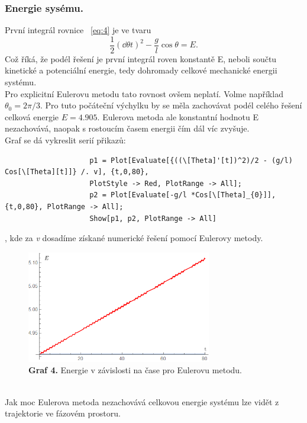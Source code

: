 \documentclass[reqno, a4paper]{amsart}
\begin{document}
				\subsubsection{Energie sysému.} První integrál rovnice ~\eqref{eq:4} je ve tvaru
				\begin{equation}
					\frac{1}{2}
					\left(
					\dd{\theta}{t}
					\right)^2
					-
					\frac{g}{l}
					\cos \theta
					=
					E
					.
				\end{equation}
				Což říká, že podél řešení je první integrál roven konstantě E, neboli součtu kinetické a potenciální energie, tedy dohromady celkové mechanické energii systému.
				\\
				Pro explicitní Eulerovu metodu tato rovnost ovšem neplatí. Volme například $\theta_{0} =2\pi/3$. Pro tuto počáteční výchylku by se měla zachovávat podél celého řešení celková energie $E=4.905$. Eulerova metoda ale konstantní hodnotu E nezachovává, naopak s rostoucím časem energii čím dál víc zvyšuje.
				\\
				Graf se dá vykreslit serií přikazů:
				\begin{verbatim}
					p1 = Plot[Evaluate[{((\[Theta]'[t])^2)/2 - (g/l) Cos[\[Theta][t]]} /. v], {t,0,80}, 
					PlotStyle -> Red, PlotRange -> All];
					p2 = Plot[Evaluate[-g/l *Cos[\[Theta]_{0}]], {t,0,80}, PlotRange -> All];
					Show[p1, p2, PlotRange -> All]
				\end{verbatim}
				, kde za \textit{v} dosadíme získané numerické řešení pomocí Eulerovy metody.
				\begin{figure}[h]
					\centering
					\includegraphics[width=0.72\textwidth]{energie}
					\caption*{\textbf{Graf 4.} Energie v závislosti na čase pro Eulerovu metodu.}  
				\end{figure}
				\\
				Jak moc Eulerova metoda nezachovává celkovou energie systému lze vidět z trajektorie ve fázovém prostoru.\
				\\
\end{document}
